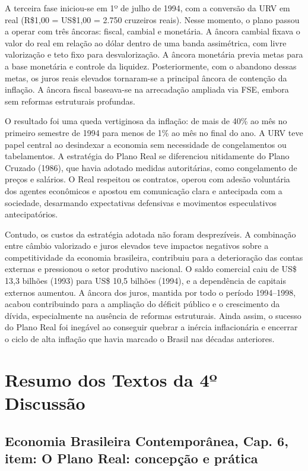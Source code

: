 \documentclass[a4paper,12pt]{article}[abntex2]
\begin{document}
A terceira fase iniciou-se em 1º de julho de 1994, com a conversão da URV em real (R\$1,00 = US\$1,00 = 2.750 cruzeiros reais). Nesse momento, o plano passou a operar com três âncoras: fiscal, cambial e monetária. A âncora cambial fixava o valor do real em relação ao dólar dentro de uma banda assimétrica, com livre valorização e teto fixo para desvalorização. A âncora monetária previa metas para a base monetária e controle da liquidez. Posteriormente, com o abandono dessas metas, os juros reais elevados tornaram-se a principal âncora de contenção da inflação. A âncora fiscal baseava-se na arrecadação ampliada via FSE, embora sem reformas estruturais profundas.

O resultado foi uma queda vertiginosa da inflação: de mais de 40\% ao mês no primeiro semestre de 1994 para menos de 1\% ao mês no final do ano. A URV teve papel central ao desindexar a economia sem necessidade de congelamentos ou tabelamentos. A estratégia do Plano Real se diferenciou nitidamente do Plano Cruzado (1986), que havia adotado medidas autoritárias, como congelamento de preços e salários. O Real respeitou os contratos, operou com adesão voluntária dos agentes econômicos e apostou em comunicação clara e antecipada com a sociedade, desarmando expectativas defensivas e movimentos especulativos antecipatórios.

Contudo, os custos da estratégia adotada não foram desprezíveis. A combinação entre câmbio valorizado e juros elevados teve impactos negativos sobre a competitividade da economia brasileira, contribuiu para a deterioração das contas externas e pressionou o setor produtivo nacional. O saldo comercial caiu de US\$ 13,3 bilhões (1993) para US\$ 10,5 bilhões (1994), e a dependência de capitais externos aumentou. A âncora dos juros, mantida por todo o período 1994–1998, acabou contribuindo para a ampliação do déficit público e o crescimento da dívida, especialmente na ausência de reformas estruturais. Ainda assim, o sucesso do Plano Real foi inegável ao conseguir quebrar a inércia inflacionária e encerrar o ciclo de alta inflação que havia marcado o Brasil nas décadas anteriores.


\newpage
\section{\textbf{Resumo dos Textos da 4º Discussão}}
\subsection{\textbf{Economia Brasileira Contemporânea, Cap. 6, item: O Plano Real: concepção e prática}}
\end{document}
